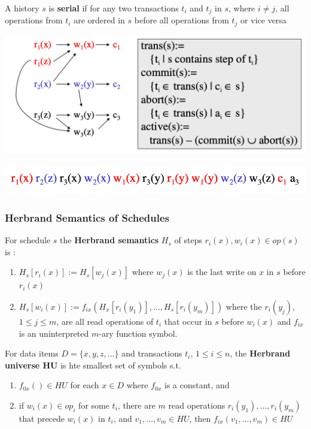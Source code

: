 \documentclass[11pt]{article}
\begin{document}
\begin{definition}[]
A history \(s\) is \textbf{serial} if for any two transactions \(t_i\) and \(t_j\) in \(s\),
where \(i\neq j\), all operations from \(t_i\) are ordered in \(s\) before all operations
from \(t_j\) or vice versa
\end{definition}

\begin{center}
\includegraphics[width=.8\textwidth]{../images/bigdatabase/6.png}
\label{}
\end{center}

\begin{center}
\includegraphics[width=.8\textwidth]{../images/bigdatabase/5.png}
\label{}
\end{center}
\subsubsection{Herbrand Semantics of Schedules}
\label{sec:org23db092}
\begin{definition}
For schedule \(s\) the \textbf{Herbrand semantics} \(H_s\) of steps \(r_i(x),w_i(x)\in op(s)\) is :
\begin{enumerate}
\item \(H_s[r_i(x)]:=H_s[w_j(x)]\) where \(w_j(x)\) is the last write on \(x\) in \(s\)
before \(r_i(x)\)
\item \(H_s[w_i(x)]:=f_{ix}(H_x[r_i(y_1)],\dots,H_s[r_i(y_m)])\) where
the \(r_i(y_j)\), \(1\le j\le m\), are all read operations of \(t_i\) that occur in \(s\)
before \(w_i(x)\) and \(f_{ix}\) is an uninterpreted \(m\)-ary function symbol.
\end{enumerate}
\end{definition}

\begin{definition}
For data items \(D=\{x,y,z,\dots\}\) and transactions \(t_i\), \(1\le i\le n\), the \textbf{Herbrand
universe HU} is hte smallest set of symbols s.t.
\begin{enumerate}
\item \(f_{0x}()\in HU\) for each \(x\in D\) where \(f_{0x}\) is a constant, and
\item if \(w_i(x)\in op_i\) for some \(t_i\), there are \(m\) read
operations \(r_i(y_1),\dots,r_i(y_m)\) that precede \(w_i(x)\) in \(t_i\),
and \(v_1,\dots,v_m\in HU\), then \(f_{ix}(v_1,\dots,v_m)\in HU\)
\end{enumerate}
\end{definition}
\end{document}
